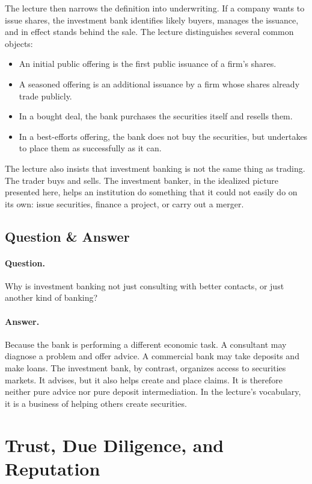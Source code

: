 The lecture then narrows the definition into underwriting. If a company wants to issue shares, the investment bank identifies likely buyers, manages the issuance, and in effect stands behind the sale. The lecture distinguishes several common objects:

\begin{itemize}
\item An initial public offering is the first public issuance of a firm's shares.
\item A seasoned offering is an additional issuance by a firm whose shares already trade publicly.
\item In a bought deal, the bank purchases the securities itself and resells them.
\item In a best-efforts offering, the bank does not buy the securities, but undertakes to place them as successfully as it can.
\end{itemize}

The lecture also insists that investment banking is not the same thing as trading. The trader buys and sells. The investment banker, in the idealized picture presented here, helps an institution do something that it could not easily do on its own: issue securities, finance a project, or carry out a merger.

\subsection{Question \& Answer}

\paragraph{Question.} Why is investment banking not just consulting with better contacts, or just another kind of banking?

\paragraph{Answer.} Because the bank is performing a different economic task. A consultant may diagnose a problem and offer advice. A commercial bank may take deposits and make loans. The investment bank, by contrast, organizes access to securities markets. It advises, but it also helps create and place claims. It is therefore neither pure advice nor pure deposit intermediation. In the lecture's vocabulary, it is a business of helping others create securities.

\section{Trust, Due Diligence, and Reputation}

